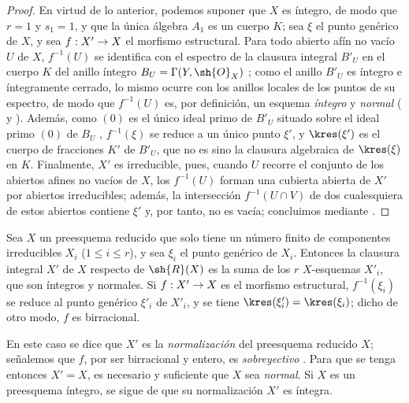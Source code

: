 \documentclass[oneside,10pt]{amsart}
\makeatletter
\renewcommand{\leq}{\leqslant}
\newcommand{\ega@arrow}[2]{\mathchoice{#1}{#2}{#2}{#2}}
\renewcommand{\to}{\ega@arrow{\longrightarrow}{\rightarrow}}
\let\EGAOriginalLabel\label
\renewcommand{\label}[1]{\phantomsection\EGAOriginalLabel{#1}}
\makeatother
\begin{document}
\begin{proof}
En virtud de lo anterior, podemos suponer que $X$ es íntegro, de modo que $r=1$ y $s_1=1$, y que la única álgebra $A_1$ es un cuerpo $K$;
sea $\xi$ el punto genérico de $X$, y sea $f:X'\to X$ el morfismo estructural.
Para todo abierto afín no vacío $U$ de $X$, $f^{-1}(U)$ se identifica con el espectro de la clausura integral $B'_U$ en el cuerpo $K$ del anillo íntegro $B_U=\Gamma(Y,\sh{O}_X)$ ;
como el anillo $B'_U$ es íntegro e íntegramente cerrado, lo mismo ocurre con los anillos locales de los puntos de su espectro, de modo que $f^{-1}(U)$ es, por definición, un esquema \emph{íntegro} y \emph{normal} ( y ).
Además, como $(0)$ es el único ideal primo de $B'_U$ situado sobre el ideal primo $(0)$ de $B_U$ \cite[t.~I, p.~259]{I-13}, $f^{-1}(\xi)$ se reduce a un único punto $\xi'$, y $\kres(\xi')$ es el cuerpo de fracciones $K'$ de $B'_U$, que no es sino la clausura algebraica de $\kres(\xi)$ en $K$.
Finalmente, $X'$ es irreducible, pues, cuando $U$ recorre el conjunto de los abiertos afines no vacíos de $X$, los $f^{-1}(U)$ forman una cubierta abierta de $X'$ por abiertos irreducibles;
además, la intersección $f^{-1}(U\cap V)$ de dos cualesquiera de estos abiertos contiene $\xi'$ y, por tanto, no es vacía; concluimos mediante .
\end{proof}

\begin{corollary}[6.3.8]
\label{II.6.3.8}
Sea $X$ un preesquema reducido que solo tiene un número finito de componentes irreducibles $X_i$ ($1\leq i\leq r$), y sea $\xi_i$ el punto genérico de $X_i$.
Entonces la clausura integral $X'$ de $X$ respecto de $\sh{R}(X)$ es la suma de los $r$ $X$-esquemas $X'_i$, que son íntegros y normales.
Si $f:X'\to X$ es el morfismo estructural, $f^{-1}(\xi_i)$ se reduce al punto genérico $\xi'_i$ de $X'_i$, y se tiene $\kres(\xi'_i)=\kres(\xi_i)$; dicho de otro modo, $f$ es birracional.
\end{corollary}

En este caso se dice que $X'$ es la \emph{normalización} del preesquema reducido $X$;
señalemos que $f$, por ser birracional y entero, es \emph{sobreyectivo} .
Para que se tenga entonces $X'=X$, es necesario y suficiente que $X$ sea \emph{normal}.
Si $X$ es un preesquema íntegro, se sigue de  que su normalización $X'$ es íntegra.
\end{document}
